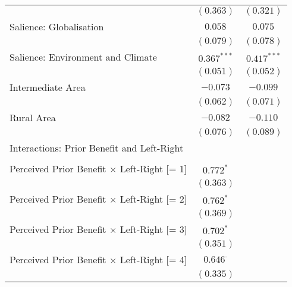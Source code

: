 \begin{center}
\begin{tiny}
\begin{longtable}{l@{} c@{} c@{}}
                                                         & $(0.363)$        & $(0.321)$        \\
\quad Salience: Globalisation                            & $0.058$          & $0.075$          \\
                                                         & $(0.079)$        & $(0.078)$        \\
\quad Salience: Environment and Climate                  & $0.367^{***}$    & $0.417^{***}$    \\
                                                         & $(0.051)$        & $(0.052)$        \\
\quad Intermediate Area                                  & $-0.073$         & $-0.099$         \\
                                                         & $(0.062)$        & $(0.071)$        \\
\quad Rural Area                                         & $-0.082$         & $-0.110$         \\
                                                         & $(0.076)$        & $(0.089)$        \\
Interactions: Prior Benefit and Left-Right               &                  &                  \\
                                                         &                  &                  \\
\quad Perceived Prior Benefit $\times$ Left-Right [= 1]  & $0.772^{*}$      &                  \\
                                                         & $(0.363)$        &                  \\
\quad Perceived Prior Benefit $\times$ Left-Right [= 2]  & $0.762^{*}$      &                  \\
                                                         & $(0.369)$        &                  \\
\quad Perceived Prior Benefit $\times$ Left-Right [= 3]  & $0.702^{*}$      &                  \\
                                                         & $(0.351)$        &                  \\
\quad Perceived Prior Benefit $\times$ Left-Right [= 4]  & $0.646^{\cdot}$  &                  \\
                                                         & $(0.335)$        &                  \\

\end{longtable}
\end{tiny}
\end{center}
